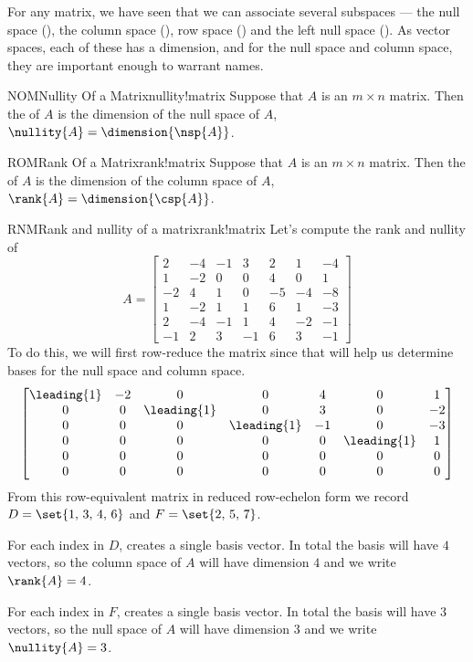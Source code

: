 %
%
For any matrix, we have seen that we can associate several subspaces --- the null space (), the column space (), row space () and the left null space  ().  As vector spaces, each of these has a dimension, and for the null space and column space, they are important enough to warrant names. %
%
\begin{definition}{NOM}{Nullity Of a Matrix}{nullity!matrix}
Suppose that $A$ is an $m\times n$ matrix.  Then the  of $A$ is the dimension of the null space of $A$, $\nullity{A}=\dimension{\nsp{A}}$.
\end{definition}
%
\begin{definition}{ROM}{Rank Of a Matrix}{rank!matrix}
Suppose that $A$ is an $m\times n$ matrix.  Then the  of $A$ is the dimension of the column space of $A$, $\rank{A}=\dimension{\csp{A}}$.
\end{definition}
%
\begin{example}{RNM}{Rank and nullity of a matrix}{rank!matrix}
Let's compute the rank and nullity of 
%
\begin{equation*}
A=\begin{bmatrix}
2 & -4 & -1 & 3 & 2 & 1 & -4\\ 
1 & -2 & 0 & 0 & 4 & 0 & 1\\ 
-2 & 4 & 1 & 0 & -5 & -4 & -8\\ 
1 & -2 & 1 & 1 & 6 & 1 & -3\\ 
2 & -4 & -1 & 1 & 4 & -2 & -1\\ 
-1 & 2 & 3 & -1 & 6 & 3 & -1
\end{bmatrix}
\end{equation*}
%
To do this, we will first row-reduce the matrix since that will help us determine bases for the null space and column space.
%
\begin{equation*}
\begin{bmatrix}
\leading{1} & -2 & 0 & 0 & 4 & 0 & 1\\ 
0 & 0 & \leading{1} & 0 & 3 & 0 & -2\\ 
0 & 0 & 0 & \leading{1} & -1 & 0 & -3\\ 
0 & 0 & 0 & 0 & 0 & \leading{1} & 1\\ 
0 & 0 & 0 & 0 & 0 & 0 & 0\\ 
0 & 0 & 0 & 0 & 0 & 0 & 0
\end{bmatrix}
\end{equation*}
%
From this row-equivalent matrix in reduced row-echelon form we record $D=\set{1,\,3,\,4,\,6}$ and $F=\set{2,\,5,\,7}$.\par
%
For each index in $D$,  creates a single basis vector.  In total the basis will have $4$ vectors, so the column space of $A$ will have dimension $4$ and we write $\rank{A}=4$.\par
%
For each index in $F$,  creates a single basis vector.  In total the basis will have $3$ vectors, so the null space of $A$ will have dimension $3$ and we write $\nullity{A}=3$.
%
\end{example}
